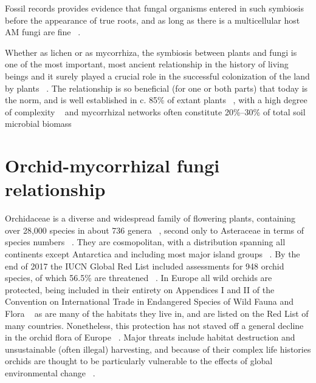 Fossil records provides evidence that fungal organisms entered in such symbiosis before the appearance of true roots, and as long as there is a multicellular host AM fungi are fine ~\citep{wang2006, bonfante2008}.

Whether as lichen or as mycorrhiza, the symbiosis between plants and fungi is one of the most important, most ancient relationship in the history of living beings and it surely played a crucial role in the successful colonization of the land by plants ~\citep{pirozynski1975, malloch1980, harley1987, trappe1987, selosse1998, brundrett2002}. The relationship is so beneficial (for one or both parts) that today is the norm, and is well established in c. 85\% of extant plants ~\citep{cairney2000, strullu-derrien2018}, with a high degree of complexity ~\citep{heijden2015} and mycorrhizal networks often constitute 20\%–30\% of total soil microbial biomass ~\citep{leake2011}

\chapter{Orchid-mycorrhizal fungi relationship}
\label{orchid-mycorrhizalfungirelationship}

Orchidaceae is a diverse and widespread family of flowering plants, containing over 28,000 species in about 736 genera ~\citep{christenhusz2016}, second only to Asteraceae in terms of species numbers ~\citep{ramirez2007}. They are cosmopolitan, with a distribution spanning all continents except Antarctica and including most major island groups ~\citep{givnish2016}.
By the end of 2017 the IUCN Global Red List included assessments for 948 orchid species, of which 56.5\% are threatened ~\citep{fay2018}. In Europe all wild orchids are protected, being included in their entirety on Appendices I and II of the Convention on International Trade in Endangered Species of Wild Fauna and Flora ~\citep{CITES-1} as are many of the habitats they live in, and are listed on the Red List of many countries. Nonetheless, this protection has not staved off a general decline in the orchid flora of Europe ~\citep{jacquemyn2005, kull2006}. Major threats include habitat destruction and unsustainable (often illegal) harvesting, and because of their complex life histories orchids are thought to be particularly vulnerable to the effects of global environmental change ~\citep{kull2016, gale2018}.

